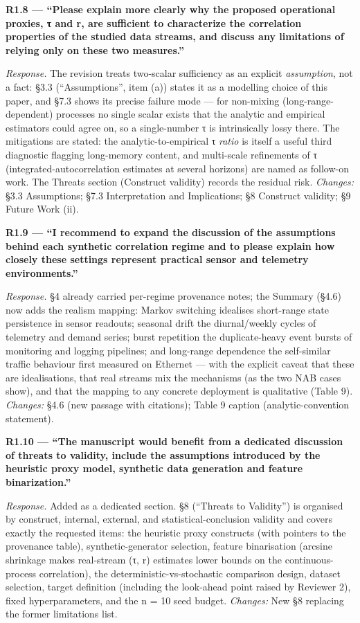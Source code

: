 \documentclass[
  11pt,
]{article}
\begin{document}
\textbf{R1.8 --- ``Please explain more clearly why the proposed
operational proxies, τ and r, are sufficient to characterize the
correlation properties of the studied data streams, and discuss any
limitations of relying only on these two measures.''}

\emph{Response.} The revision treats two-scalar sufficiency as an
explicit \emph{assumption}, not a fact: §3.3 (``Assumptions'', item (a))
states it as a modelling choice of this paper, and §7.3 shows its
precise failure mode --- for non-mixing (long-range-dependent) processes
no single scalar exists that the analytic and empirical estimators could
agree on, so a single-number τ is intrinsically lossy there. The
mitigations are stated: the analytic-to-empirical τ \emph{ratio} is
itself a useful third diagnostic flagging long-memory content, and
multi-scale refinements of τ (integrated-autocorrelation estimates at
several horizons) are named as follow-on work. The Threats section
(Construct validity) records the residual risk. \emph{Changes:} §3.3
Assumptions; §7.3 Interpretation and Implications; §8 Construct
validity; §9 Future Work (ii).

\textbf{R1.9 --- ``I recommend to expand the discussion of the
assumptions behind each synthetic correlation regime and to please
explain how closely these settings represent practical sensor and
telemetry environments.''}

\emph{Response.} §4 already carried per-regime provenance notes; the
Summary (§4.6) now adds the realism mapping: Markov switching idealises
short-range state persistence in sensor readouts; seasonal drift the
diurnal/weekly cycles of telemetry and demand series; burst repetition
the duplicate-heavy event bursts of monitoring and logging pipelines;
and long-range dependence the self-similar traffic behaviour first
measured on Ethernet --- with the explicit caveat that these are
idealisations, that real streams mix the mechanisms (as the two NAB
cases show), and that the mapping to any concrete deployment is
qualitative (Table 9). \emph{Changes:} §4.6 (new passage with
citations); Table 9 caption (analytic-convention statement).

\textbf{R1.10 --- ``The manuscript would benefit from a dedicated
discussion of threats to validity, include the assumptions introduced by
the heuristic proxy model, synthetic data generation and feature
binarization.''}

\emph{Response.} Added as a dedicated section. §8 (``Threats to
Validity'') is organised by construct, internal, external, and
statistical-conclusion validity and covers exactly the requested items:
the heuristic proxy constructs (with pointers to the provenance table),
synthetic-generator selection, feature binarisation (arcsine shrinkage
makes real-stream (τ, r) estimates lower bounds on the
continuous-process correlation), the deterministic-vs-stochastic
comparison design, dataset selection, target definition (including the
look-ahead point raised by Reviewer 2), fixed hyperparameters, and the n
= 10 seed budget. \emph{Changes:} New §8 replacing the former
limitations list.
\end{document}
